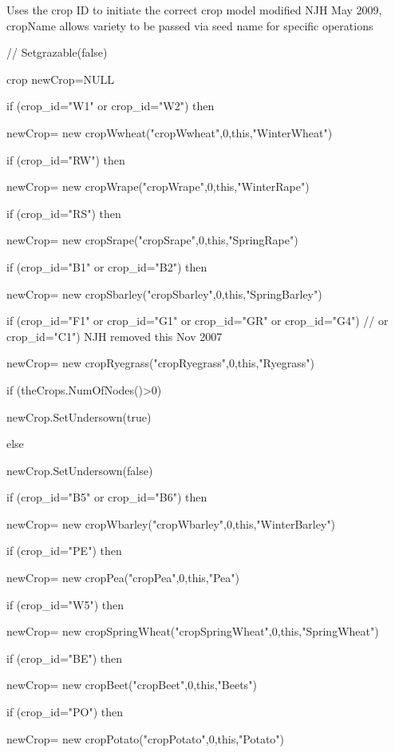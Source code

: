 \documentclass[%
]{scrartcl}
\begin{document}
{{{Uses the crop ID  to initiate the correct crop model
modified NJH May 2009, cropName allows variety to be passed via seed name for specific operations


//	Setgrazable(false)

   crop   newCrop=NULL
   
   if (crop\_id="W1" or crop\_id="W2") then
    
      \quad  newCrop= new cropWwheat("cropWwheat",0,this,"WinterWheat")
  
   if (crop\_id="RW") then
    
      \quad  newCrop= new cropWrape("cropWrape",0,this,"WinterRape")
  
  if (crop\_id="RS") then
    
      \quad  newCrop= new cropSrape("cropSrape",0,this,"SpringRape")
   
   if (crop\_id="B1" or crop\_id="B2") then
    
      \quad  newCrop= new cropSbarley("cropSbarley",0,this,"SpringBarley")
   
   if (crop\_id="F1" or crop\_id="G1" or crop\_id="GR" or crop\_id="G4") // or crop\_id="C1")   NJH removed this Nov 2007
  
   
\quad     newCrop= new cropRyegrass("cropRyegrass",0,this,"Ryegrass")
    
\quad    if (theCrops.NumOfNodes()>0)
    
\quad  \quad   		newCrop.SetUndersown(true)
   
 \quad    else
    
 \quad  \quad      newCrop.SetUndersown(false)
  
   
   if (crop\_id="B5" or crop\_id="B6") then
    
      \quad  newCrop= new cropWbarley("cropWbarley",0,this,"WinterBarley")
 
   if (crop\_id="PE") then
    
      \quad  newCrop= new cropPea("cropPea",0,this,"Pea")
  
   if (crop\_id="W5") then
   
     \quad   newCrop= new cropSpringWheat("cropSpringWheat",0,this,"SpringWheat")
   
   if (crop\_id="BE") then
   
     \quad   newCrop= new cropBeet("cropBeet",0,this,"Beets")
   
   if (crop\_id="PO") then
   
      \quad  newCrop= new cropPotato("cropPotato",0,this,"Potato")
  
}}}
\end{document}
